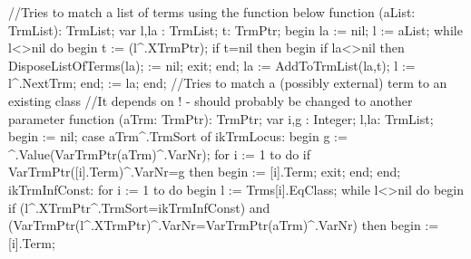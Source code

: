 //Tries to match a list of terms using the function below
function (aList: TrmList): TrmList;
var
   l,la : TrmList;
   t: TrmPtr;
begin
   la := nil;
   l := aList;
   while l<>nil do
   begin
      t := (l^.XTrmPtr);
      if t=nil then
      begin
         if la<>nil then DisposeListOfTerms(la);
          := nil;
         exit;
      end;
      la := AddToTrmList(la,t);
      l := l^.NextTrm;
   end;
    := la;
end;
\eatline
{}\nwendcode{}\nwdocspar
\nwenddocs{}\endmoddef\nwstartdeflinemarkup\nwenddeflinemarkup
//Tries to match a (possibly external) term to an existing class
//It depends on ! - should probably be changed to another parameter
function (aTrm: TrmPtr): TrmPtr;
var
   i,g : Integer;
   l,la: TrmList;
begin
    := nil;
   case aTrm^.TrmSort of
      ikTrmLocus:
         begin
            g := ^.Value(VarTrmPtr(aTrm)^.VarNr);
            for i := 1 to  do
               if VarTrmPtr([i].Term)^.VarNr=g then
               begin  := [i].Term;
               exit;
               end;
         end;
      ikTrmInfConst:
         for i := 1 to  do
         begin
            l := Trms[i].EqClass;
            while l<>nil do
            begin
               if (l^.XTrmPtr^.TrmSort=ikTrmInfConst) and (VarTrmPtr(l^.XTrmPtr)^.VarNr=VarTrmPtr(aTrm)^.VarNr) then
               begin
                   := [i].Term;
